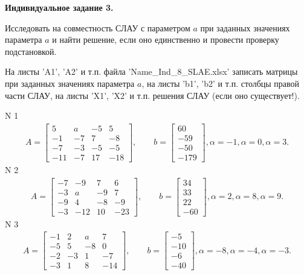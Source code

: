 \documentclass[11pt]{report}
\begin{document}
\pagestyle{empty}

{\bf Индивидуальное задание 3.}


Исследовать на совместность СЛАУ с параметром $a$ при заданных значениях
параметра $a$ и найти решение, если оно единственно
и провести проверку подстановкой.


На листы 'A1', 'A2' и т.п. файла 'Name\_Ind\_8\_SLAE.xlsx' записать матрицы
при заданных значениях параметра $a$, на листы 'b1', 'b2' и т.п.
столбцы правой части СЛАУ, на листы 'X1', 'X2' и т.п.
решения СЛАУ (если оно существует!).


N 1
\begin{align*}
 A = \left[\begin{matrix}5 & a & -5 & 5\\-1 & -7 & 7 & -8\\-7 & -3 & -5 & -5\\-11 & -7 & 17 & -18\end{matrix}\right],
    \qquad b = \left[\begin{matrix}60\\-59\\-50\\-179\end{matrix}\right], \alpha = -1, \alpha = 0, \alpha = 3. 
 \end{align*}
N 2
\begin{align*}
 A = \left[\begin{matrix}-7 & -9 & 7 & 6\\-3 & a & -9 & 7\\-9 & 4 & -8 & -9\\-3 & -12 & 10 & -23\end{matrix}\right],
    \qquad b = \left[\begin{matrix}34\\33\\22\\-60\end{matrix}\right], \alpha = 2, \alpha = 8, \alpha = 9. 
 \end{align*}
N 3
\begin{align*}
 A = \left[\begin{matrix}-1 & 2 & a & 7\\-5 & 5 & -8 & 0\\-2 & -3 & 1 & -7\\-3 & 1 & 8 & -14\end{matrix}\right],
    \qquad b = \left[\begin{matrix}-5\\-10\\-6\\-40\end{matrix}\right], \alpha = -8, \alpha = -4, \alpha = -3. 
 \end{align*}
\end{document}

